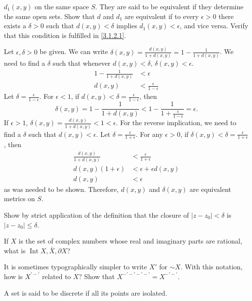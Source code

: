 \begin{exercise}[ref = \arabic{exercisei}]
  \(d_1(x,y)\) on the same space \(S\).
  They are said to be equivalent if they determine the same open sets.
  Show that \(d\) and \(d_1\) are equivalent if to every \(\epsilon > 0\) there
  exists a \(\delta > 0\) such that \(d(x,y) < \delta\) implies
  \(d_1(x,y) < \epsilon\), and vice versa.
  Verify that this condition is fulfilled in \cref{3.1.2.1}.
  \par\smallskip
  Let \(\epsilon,\delta > 0\) be given.
  We can write
  \(\delta(x,y) = \frac{d(x,y)}{1 + d(x,y)} = 1 - \frac{1}{1 + d(x,y)}\).
  We need to find a \(\delta\) such that whenever \(d(x,y) < \delta\),
  \(\delta(x,y) < \epsilon\).
  \begin{align*}
    1 - \frac{1}{1 + d(x, y)} & < \epsilon\\
    d(x, y) & < \frac{\epsilon}{1 - \epsilon}
  \end{align*}
  Let \(\delta = \frac{\epsilon}{1 - \epsilon}\).
  For \(\epsilon < 1\), if \(d(x,y) < \delta = \frac{\epsilon}{1 - \epsilon}\),
  then
  \[
  \delta(x,y) = 1 - \frac{1}{1 + d(x, y)} < 1 -
  \frac{1}{1 + \frac{\epsilon}{1 - \epsilon}} = \epsilon.
  \]
  If \(\epsilon > 1\),
  \(\delta(x,y) = \frac{d(x,y)}{1 + d(x,y)} < 1 < \epsilon\).
  For the reverse implication, we need to find a \(\delta\) such that
  \(d(x,y) < \epsilon\).
  Let \(\delta = \frac{\epsilon}{1 + \epsilon}\).
  For any \(\epsilon > 0\), if
  \(\delta(x,y) < \delta = \frac{\epsilon}{1 + \epsilon}\), then
  \begin{align*}
    \frac{d(x, y)}{1 + d(x, y)} & < \frac{\epsilon}{1 + \epsilon}\\
    d(x, y)(1 + \epsilon) & < \epsilon + \epsilon d(x, y)\\
    d(x, y) & < \epsilon
  \end{align*}
  as was needed to be shown.
  Therefore, \(d(x,y)\) and \(\delta(x,y)\) are equivalent metrics on \(S\).
\item
  Show by strict application of the definition that the closure of
  \(\lvert z - z_0\rvert < \delta\) is \(\lvert z - z_0\rvert\leq\delta\).
\item
  If \(X\) is the set of complex numbers whose real and imaginary parts are
  rational, what is \(\operatorname{Int} X, \bar{X}, \partial X\)?
\item
  It is sometimes typographically simpler to write \(X'\) for \(\sim X\).
  With this notation, how is \(X^{'-'}\) related to \(X\)?
  Show that \(X^{-'-'-'-'} = X^{-'-'}\).
\item
  A set is said to be discrete if all its points are isolated.

\end{exercise}
